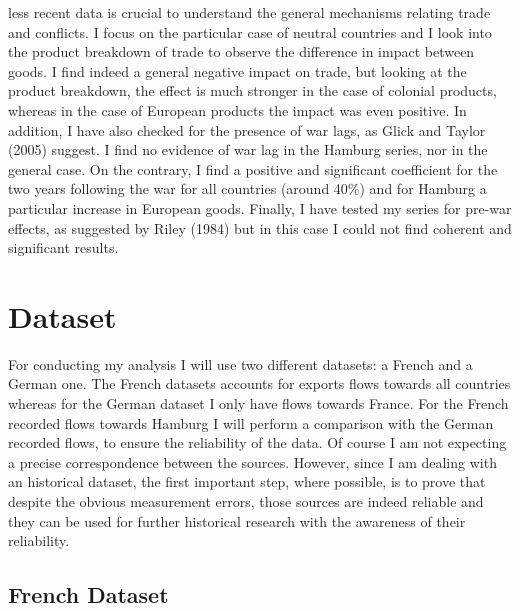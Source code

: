 \documentclass[12pt,a4paper,titlepage,english]{article}
\begin{document}
less recent data is crucial to understand the general mechanisms relating trade and conflicts. I focus on the particular case of neutral countries and I look into the product breakdown of trade to observe the difference in impact between goods. I find indeed a general negative impact on trade, but looking at the product breakdown, the effect is much stronger in the case of colonial products, whereas in the case of European products the impact was even positive. In addition, I have also checked for the presence of war lags, as Glick and Taylor (2005) suggest. I find no evidence of war lag in the Hamburg series, nor in the general case. On the contrary, I find a positive and significant coefficient for the two years following the war for all countries (around 40\%) and for Hamburg a particular increase in European goods. Finally, I have tested my series for pre-war effects, as suggested by Riley (1984) but in this case I could not find coherent and significant results.  


\section{Dataset}
For conducting my analysis I will use two different datasets: a French and a German one. The French datasets accounts for exports flows towards all countries whereas for the German dataset I only have flows towards France. For the French recorded flows towards Hamburg I will perform a comparison with the German recorded flows, to ensure the reliability of the data. Of course I am not expecting a precise correspondence between the sources. However, since I am dealing with an historical dataset, the first important step, where possible, is to prove that despite the obvious measurement errors, those sources are indeed reliable and they can be used for further historical research with the awareness of their reliability. 

\subsection{French Dataset}
\end{document}
